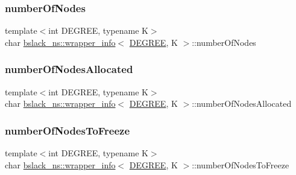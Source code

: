 \mbox{\label{classbslack__ns_1_1wrapper__info_ab3e7f2a621bdeb213e54e45a98cc3d8d}} 
\subsubsection{\texorpdfstring{number\+Of\+Nodes}{numberOfNodes}}
{\footnotesize\ttfamily template$<$int D\+E\+G\+R\+EE, typename K$>$ \\
char \hyperlink{classbslack__ns_1_1wrapper__info}{bslack\+\_\+ns\+::wrapper\+\_\+info}$<$ \hyperlink{brown__sigouin__abtree__kcas_2adapter_8h_a5d88b17d70c985f2f2b8e987037fd6dd}{D\+E\+G\+R\+EE}, K $>$\+::number\+Of\+Nodes}

\mbox{\label{classbslack__ns_1_1wrapper__info_a6daa6974ed40c90ff51a76d0ae155d1e}} 
\subsubsection{\texorpdfstring{number\+Of\+Nodes\+Allocated}{numberOfNodesAllocated}}
{\footnotesize\ttfamily template$<$int D\+E\+G\+R\+EE, typename K$>$ \\
char \hyperlink{classbslack__ns_1_1wrapper__info}{bslack\+\_\+ns\+::wrapper\+\_\+info}$<$ \hyperlink{brown__sigouin__abtree__kcas_2adapter_8h_a5d88b17d70c985f2f2b8e987037fd6dd}{D\+E\+G\+R\+EE}, K $>$\+::number\+Of\+Nodes\+Allocated}

\mbox{\label{classbslack__ns_1_1wrapper__info_ae638a51d89fc70f4924c21ffb5957f77}} 
\subsubsection{\texorpdfstring{number\+Of\+Nodes\+To\+Freeze}{numberOfNodesToFreeze}}
{\footnotesize\ttfamily template$<$int D\+E\+G\+R\+EE, typename K$>$ \\
char \hyperlink{classbslack__ns_1_1wrapper__info}{bslack\+\_\+ns\+::wrapper\+\_\+info}$<$ \hyperlink{brown__sigouin__abtree__kcas_2adapter_8h_a5d88b17d70c985f2f2b8e987037fd6dd}{D\+E\+G\+R\+EE}, K $>$\+::number\+Of\+Nodes\+To\+Freeze}

